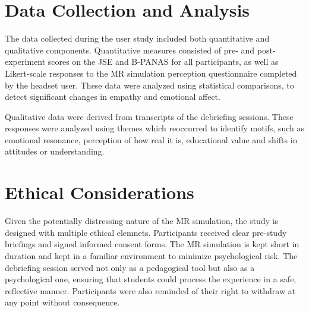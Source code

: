 \section{Data Collection and Analysis}

The data collected during the user study included both quantitative and qualitative components. Quantitative measures consisted of pre- and post-experiment scores on the JSE and B-PANAS for all participants, as well as Likert-scale responses to the MR simulation perception questionnaire completed by the headset user. These data were analyzed using statistical comparisons, to detect significant changes in empathy and emotional affect. 

\vspace{1em}

Qualitative data were derived from transcripts of the debriefing sessions. These responses were analyzed using themes which reoccurred to identify motifs, such as emotional resonance, perception of how real it is, educational value and shifts in attitudes or understanding.

\section{Ethical Considerations}

Given the potentially distressing nature of the MR simulation, the study is designed with multiple ethical elemnets. Participants received clear pre-study briefings and signed informed consent forms. The MR simulation is kept short in duration and kept in a familiar environment to minimize psychological risk. The debriefing session served not only as a pedagogical tool but also as a psychological one, ensuring that students could process the experience in a safe, reflective manner. Participants were also reminded of their right to withdraw at any point without consequence.
